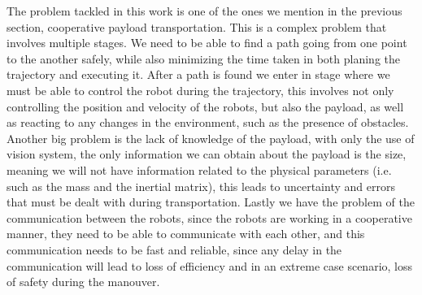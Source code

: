 The problem tackled in this work is one of the ones we mention in the previous section, cooperative payload transportation. This is a complex problem that involves multiple stages. We need to be able to find a path going from one point to the another safely, while also minimizing the time taken in both planing the trajectory and executing it. After a path is found we enter in stage where we must be able to control the robot during the trajectory, this involves not only controlling the position and velocity of the robots, but also the payload, as well as reacting to any changes in the environment, such as the presence of obstacles. Another big problem is the lack of knowledge of the payload, with only the use of vision system, the only information we can obtain about the payload is the size, meaning we will not have information related to the physical parameters (i.e. such as the mass and the inertial matrix), this leads to uncertainty and errors that must be dealt with during transportation. Lastly we have the problem of the communication between the robots, since the robots are working in a cooperative manner, they need to be able to communicate with each other, and this communication needs to be fast and reliable, since any delay in the communication will lead to loss of efficiency and in an extreme case scenario, loss of safety during the manouver.